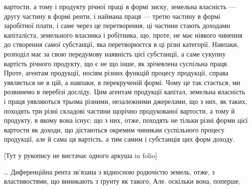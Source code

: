 вартости, а тому і продукту річної праці в формі зиску, земельна власність
— другу частину в формі ренти, і наймана праця — третю частину в формі
заробітної плати, і саме через це перетворення, ці частини стають доходами
капіталіста, земельного власника і робітника, що, проте, не має ніякого чинення
до створення самої субстанції, яка перетворюєтся в ці різні категорії. Навпаки,
розподіл має за свою передумову наявність цієї субстанції, а саме сукупну вартість
річного продукту, що є не що інше, як зрічевлена суспільна праця. Проте,
агентам продукції, носіям різних функцій процесу продукції, справа уявляється
не в цій, а навпаки, в перекрученій формі. Чому це так стається, ми розвинемо
в перебізі досліду. Цим агентам продукції капітал, земельна власність і
праця уявляються трьома різними, незалежними джерелами, що з них, як таких,
походять три різні складові частини щорічно продукованої вартости, а
тому й продукту, в якому вона існує; що з них, отже, походять не тільки різні
форми цієї вартости як доходи, що дістаються окремим чиникам суспільного процесу
продукції, але й сама ця вартість, а тим самим і субстанція цих форм
доходу.

[Тут у рукопису не вистачає одного аркуша in folio]

\dots{} Диференційна рента зв’язана з відносною родючістю земель, отже,
з властивостями, що виникають з ґрунту як такого, Але. оскільки вона, поперше,
\parbreak{}  %

